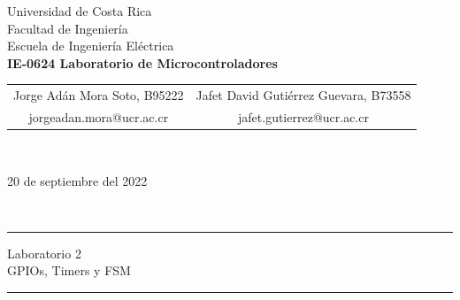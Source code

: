 \thispagestyle{empty}
\begin{center}
    \LARGE{\sc Universidad de Costa Rica}\\[-1mm]\Large{Facultad de Ingeniería}\\[-1mm]\Large{Escuela de Ingeniería} Eléctrica\\[2mm]\large{\textbf{IE-0624 Laboratorio de Microcontroladores}}
    \\[-0.10mm]
\begin{table}[H]
\centering
\begin{tabular}{cc}
Jorge Adán Mora Soto, B95222 & Jafet David Gutiérrez Guevara, B73558 \\
 \textcolor{ucrblue}{ \small{jorgeadan.mora@ucr.ac.cr}}    &  \textcolor{ucrblue}{ \small{jafet.gutierrez@ucr.ac.cr}}
\end{tabular}
\\[-6mm]
\end{table}
\large{20 de septiembre del 2022}
\end{center}


\\[-1.5cm]
\hrule
\begin{center}
\Large{Laboratorio 2}\\ \large{GPIOs, Timers y FSM}
\\[4mm]
\end{center}
\hrule
\vspace{8mm}